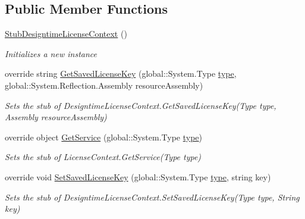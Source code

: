 \subsection*{Public Member Functions}
\begin{DoxyCompactItemize}
\item 
\hyperlink{class_system_1_1_component_model_1_1_design_1_1_fakes_1_1_stub_designtime_license_context_a6b2af27934eba14b62196d67eaf016ca}{Stub\-Designtime\-License\-Context} ()
\begin{DoxyCompactList}\small\item\em Initializes a new instance\end{DoxyCompactList}\item 
override string \hyperlink{class_system_1_1_component_model_1_1_design_1_1_fakes_1_1_stub_designtime_license_context_aff9e9befb8a7498f7a1e7961135b0a54}{Get\-Saved\-License\-Key} (global\-::\-System.\-Type \hyperlink{jquery-1_810_82-vsdoc_8js_a3940565e83a9bfd10d95ffd27536da91}{type}, global\-::\-System.\-Reflection.\-Assembly resource\-Assembly)
\begin{DoxyCompactList}\small\item\em Sets the stub of Designtime\-License\-Context.\-Get\-Saved\-License\-Key(\-Type type, Assembly resource\-Assembly)\end{DoxyCompactList}\item 
override object \hyperlink{class_system_1_1_component_model_1_1_design_1_1_fakes_1_1_stub_designtime_license_context_a42856b464b681e350e2cf55e038e640b}{Get\-Service} (global\-::\-System.\-Type \hyperlink{jquery-1_810_82-vsdoc_8js_a3940565e83a9bfd10d95ffd27536da91}{type})
\begin{DoxyCompactList}\small\item\em Sets the stub of License\-Context.\-Get\-Service(\-Type type)\end{DoxyCompactList}\item 
override void \hyperlink{class_system_1_1_component_model_1_1_design_1_1_fakes_1_1_stub_designtime_license_context_aaf0e5e75b8a042dae9e577838afae7a8}{Set\-Saved\-License\-Key} (global\-::\-System.\-Type \hyperlink{jquery-1_810_82-vsdoc_8js_a3940565e83a9bfd10d95ffd27536da91}{type}, string key)
\begin{DoxyCompactList}\small\item\em Sets the stub of Designtime\-License\-Context.\-Set\-Saved\-License\-Key(\-Type type, String key)\end{DoxyCompactList}\end{DoxyCompactItemize}
